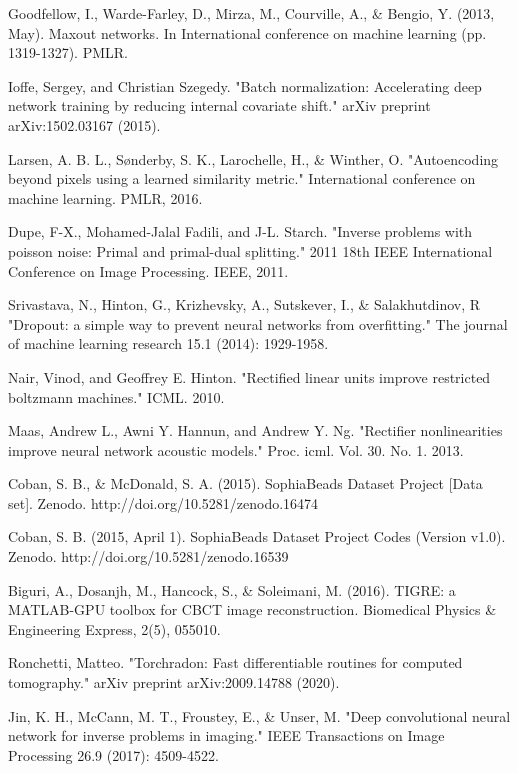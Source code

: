 \begin{thebibliography}{00}
Goodfellow, I., Warde-Farley, D., Mirza, M., Courville, A., \& Bengio, Y. (2013, May). Maxout networks. In International conference on machine learning (pp. 1319-1327). PMLR.

Ioffe, Sergey, and Christian Szegedy. "Batch normalization: Accelerating deep network training by reducing internal covariate shift." arXiv preprint arXiv:1502.03167 (2015).

Larsen, A. B. L., Sønderby, S. K., Larochelle, H., \& Winther, O. "Autoencoding beyond pixels using a learned similarity metric." International conference on machine learning. PMLR, 2016.

Dupe, F-X., Mohamed-Jalal Fadili, and J-L. Starch. "Inverse problems with poisson noise: Primal and primal-dual splitting." 2011 18th IEEE International Conference on Image Processing. IEEE, 2011.

 Srivastava, N., Hinton, G., Krizhevsky, A., Sutskever, I., \& Salakhutdinov, R "Dropout: a simple way to prevent neural networks from overfitting." The journal of machine learning research 15.1 (2014): 1929-1958.

Nair, Vinod, and Geoffrey E. Hinton. "Rectified linear units improve restricted boltzmann machines." ICML. 2010.

Maas, Andrew L., Awni Y. Hannun, and Andrew Y. Ng. "Rectifier nonlinearities improve neural network acoustic models." Proc. icml. Vol. 30. No. 1. 2013.

Coban, S. B., \& McDonald, S. A. (2015). SophiaBeads Dataset Project [Data set]. Zenodo. http://doi.org/10.5281/zenodo.16474

Coban, S. B. (2015, April 1). SophiaBeads Dataset Project Codes (Version v1.0). Zenodo. http://doi.org/10.5281/zenodo.16539

 Biguri, A., Dosanjh, M., Hancock, S., \& Soleimani, M. (2016). TIGRE: a MATLAB-GPU toolbox for CBCT image reconstruction. Biomedical Physics \& Engineering Express, 2(5), 055010.

Ronchetti, Matteo. "Torchradon: Fast differentiable routines for computed tomography." arXiv preprint arXiv:2009.14788 (2020).

Jin, K. H., McCann, M. T., Froustey, E., \& Unser, M. "Deep convolutional neural network for inverse problems in imaging." IEEE Transactions on Image Processing 26.9 (2017): 4509-4522.


\end{thebibliography}
